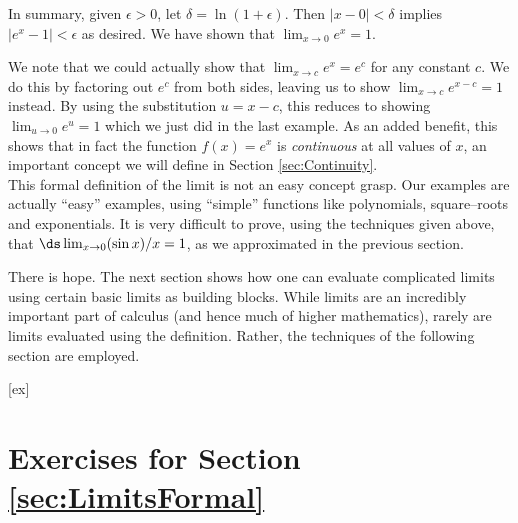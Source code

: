 \begin{solution}
{In summary, given $\epsilon > 0$, let $\delta = \ln(1+\epsilon)$. Then $|x - 0| < \delta$ implies $|e^x - 1|< \epsilon$ as desired.  We have shown that $\displaystyle \lim_{x\rightarrow 0} e^x = 1 $.
}
\end{solution}




We note that we could actually show that $\lim_{x\rightarrow c} e^x = e^c $ for any constant $c$.  We do this by factoring out $e^c$ from both sides, leaving us to show $\lim_{x\rightarrow c} e^{x-c} = 1 $ instead.  By using the substitution $u=x-c$, this reduces to showing $\lim_{u\rightarrow 0} e^u = 1 $ which we just did in the last example.  As an added benefit, this shows that in fact the function $f(x)=e^x$ is \textit{continuous} at all values of $x$, an important concept we will define in Section \ref{sec:Continuity}.\\

This formal definition of the limit is not an easy concept grasp. Our examples are actually ``easy'' examples, using ``simple'' functions like polynomials, square--roots and exponentials. It is very difficult to prove, using the techniques given above, that $\ds \lim_{x\to 0}(\sin x)/x = 1$, as we approximated in the previous section.

There is hope. The next section shows how one can evaluate complicated limits using certain basic limits as building blocks. While limits are an incredibly important part of calculus (and hence much of higher mathematics), rarely are limits evaluated using the definition. Rather, the techniques of the following section are employed.

\clearpage





[ex]
\section*{Exercises for Section \ref{sec:LimitsFormal}}

